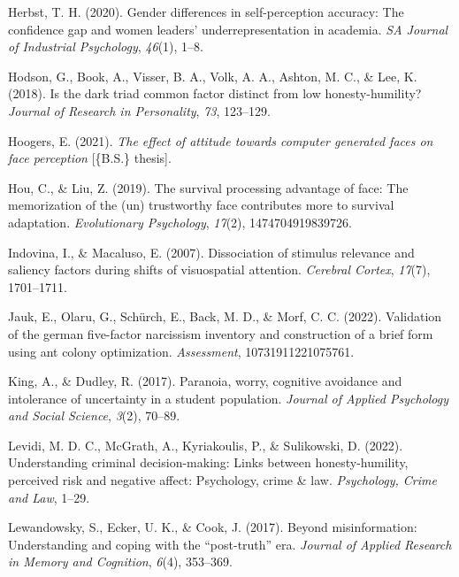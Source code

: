 \documentclass[
  man,
  floatsintext,
  longtable,
  nolmodern,
  notxfonts,
  notimes,
  colorlinks=true,linkcolor=blue,citecolor=blue,urlcolor=blue]{apa7}
\newlength{\cslhangindent}
\newenvironment{CSLReferences}[2] %
 {\begin{list}{}{%
  \setlength{\itemindent}{0pt}
  \setlength{\leftmargin}{0pt}
  \setlength{\parsep}{0pt}
  \ifodd #1
   \setlength{\leftmargin}{\cslhangindent}
   \setlength{\itemindent}{-1\cslhangindent}
  \fi
  \setlength{\itemsep}{#2\baselineskip}}}
 {\end{list}}
\begin{document}
\begin{CSLReferences}{1}{0}
Herbst, T. H. (2020). Gender differences in self-perception accuracy:
The confidence gap and women leaders' underrepresentation in academia.
\emph{SA Journal of Industrial Psychology}, \emph{46}(1), 1--8.

Hodson, G., Book, A., Visser, B. A., Volk, A. A., Ashton, M. C., \& Lee,
K. (2018). Is the dark triad common factor distinct from low
honesty-humility? \emph{Journal of Research in Personality}, \emph{73},
123--129.

Hoogers, E. (2021). \emph{The effect of attitude towards computer
generated faces on face perception} {[}\{B.S.\} thesis{]}.

Hou, C., \& Liu, Z. (2019). The survival processing advantage of face:
The memorization of the (un) trustworthy face contributes more to
survival adaptation. \emph{Evolutionary Psychology}, \emph{17}(2),
1474704919839726.

Indovina, I., \& Macaluso, E. (2007). Dissociation of stimulus relevance
and saliency factors during shifts of visuospatial attention.
\emph{Cerebral Cortex}, \emph{17}(7), 1701--1711.

Jauk, E., Olaru, G., Schürch, E., Back, M. D., \& Morf, C. C. (2022).
Validation of the german five-factor narcissism inventory and
construction of a brief form using ant colony optimization.
\emph{Assessment}, 10731911221075761.

King, A., \& Dudley, R. (2017). Paranoia, worry, cognitive avoidance and
intolerance of uncertainty in a student population. \emph{Journal of
Applied Psychology and Social Science}, \emph{3}(2), 70--89.

Levidi, M. D. C., McGrath, A., Kyriakoulis, P., \& Sulikowski, D.
(2022). Understanding criminal decision-making: Links between
honesty-humility, perceived risk and negative affect: Psychology, crime
\& law. \emph{Psychology, Crime and Law}, 1--29.

Lewandowsky, S., Ecker, U. K., \& Cook, J. (2017). Beyond
misinformation: Understanding and coping with the {``post-truth''} era.
\emph{Journal of Applied Research in Memory and Cognition}, \emph{6}(4),
353--369.


\end{CSLReferences}
\end{document}
